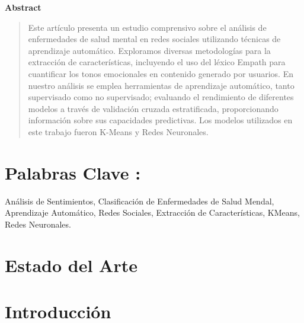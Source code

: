 \documentclass[
10pt, %
a4paper, %
oneside, %
headinclude,footinclude, %
BCOR5mm, %
]{scrartcl}
\begin{document}



\newpage %

\begin{center}
\textbf{Abstract}
\end{center}    
\begin{abstract}
Este artículo presenta un estudio comprensivo sobre el análisis de enfermedades de salud mental en redes sociales utilizando técnicas de aprendizaje automático.
Exploramos diversas metodologías para la extracción de características, incluyendo el uso del léxico Empath para cuantificar los tonos emocionales
en contenido generado por usuarios. En nuestro análisis se emplea herramientas de aprendizaje automático, tanto supervisado como no supervisado; 
evaluando el rendimiento de diferentes modelos a través de validación cruzada estratificada, proporcionando información sobre sus capacidades predictivas. Los modelos utilizados en 
este trabajo fueron K-Means y Redes Neuronales. 
\end{abstract}


\section*{Palabras Clave :} Análisis de Sentimientos, Clasificación de Enfermedades de Salud Mendal, Aprendizaje Automático, Redes
Sociales, Extracción de Características, KMeans, Redes Neuronales.

\tableofcontents

\section{Estado del Arte}

\section{Introducción}
\end{document}
